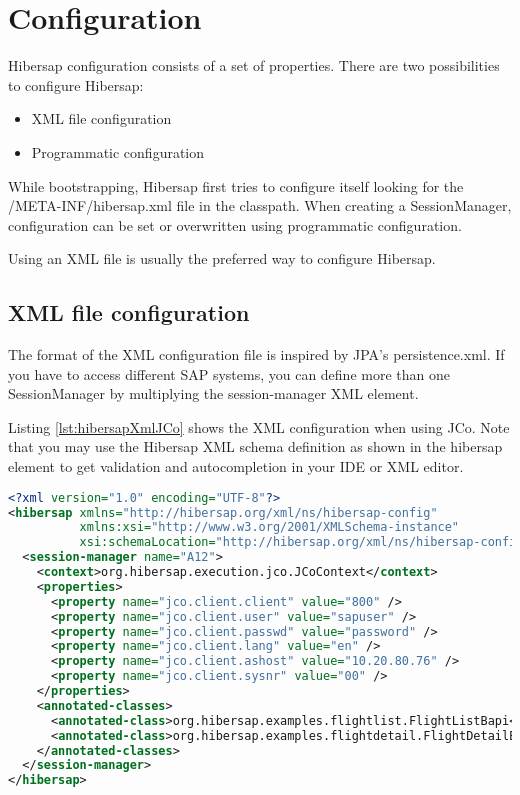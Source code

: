 
\chapter{Configuration}
\label{cha:Configuration}

Hibersap configuration consists of a set of properties. 
There are two possibilities to configure Hibersap: 
\begin{itemize}
  \item XML file configuration 
  \item Programmatic configuration
\end{itemize}

While bootstrapping, Hibersap first tries to configure itself looking for the \linebreak /META-INF/hibersap.xml file in the
classpath. When creating a SessionManager, configuration can be set or overwritten using programmatic configuration.

Using an XML file is usually the preferred way to configure Hibersap.


\section{XML file configuration}
\label{sec:XML file configuration}

The format of the XML configuration file is inspired by JPA's persistence.xml.
If you have to access different SAP systems, you can define more than one SessionManager by multiplying the
session-manager XML element.

Listing \ref{lst:hibersapXmlJCo} shows the XML configuration when using JCo. Note that you may use the Hibersap XML schema definition as shown in the hibersap element to get validation and autocompletion in your IDE or XML editor.
\newpage
\begin{lstlisting}[language=XML,caption=hibersap.xml for use with JCo,label=lst:hibersapXmlJCo]
<?xml version="1.0" encoding="UTF-8"?>
<hibersap xmlns="http://hibersap.org/xml/ns/hibersap-config" 
          xmlns:xsi="http://www.w3.org/2001/XMLSchema-instance"
          xsi:schemaLocation="http://hibersap.org/xml/ns/hibersap-config http://hibersap.sourceforge.net/xml/hibersap_1_1.xsd">
  <session-manager name="A12">
    <context>org.hibersap.execution.jco.JCoContext</context>
    <properties>
      <property name="jco.client.client" value="800" />
      <property name="jco.client.user" value="sapuser" />
      <property name="jco.client.passwd" value="password" />
      <property name="jco.client.lang" value="en" />
      <property name="jco.client.ashost" value="10.20.80.76" />
      <property name="jco.client.sysnr" value="00" />
    </properties>
    <annotated-classes>
      <annotated-class>org.hibersap.examples.flightlist.FlightListBapi</annotated-class>
      <annotated-class>org.hibersap.examples.flightdetail.FlightDetailBapi</annotated-class>
    </annotated-classes>
  </session-manager>
</hibersap>
\end{lstlisting}


